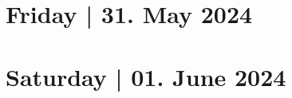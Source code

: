 \documentclass[openany, parskip=full, 12pt, a4]{scrbook}
\begin{document}
\chapter{Friday | 31. May 2024}
% 


\chapter{Saturday | 01. June 2024}
% 



\newpage
\pagecolor{myblue}
\thispagestyle{empty}
\mbox{}
\end{document}
